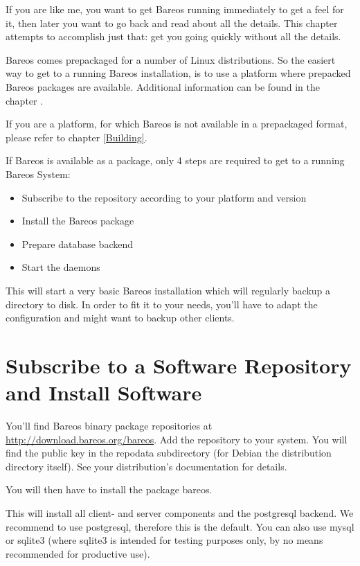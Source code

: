 If you are like me, you want to get Bareos running immediately to get a feel
for it, then later you want to go back and read about all the details. This
chapter attempts to accomplish just that: get you going quickly without all
the details.

Bareos comes prepackaged for a number of Linux distributions.
So the easiert way to get to a running Bareos installation, 
is to use a platform where prepacked Bareos packages are available.
Additional information can be found in the chapter .

If you are a platform, for which Bareos is not available in a prepackaged format,
please refer to chapter \vref{Building}.

If Bareos is available as a package, 
only 4 steps are required to get to a running Bareos System:
\begin{itemize}
    \item Subscribe to the repository according to your platform and version
    \item Install the Bareos package
    \item Prepare database backend
    \item Start the daemons
\end{itemize}

This will start a very basic Bareos installation which will regularly backup a directory to disk.
In order to fit it to your needs, you'll have to adapt the configuration and might want to backup other clients.

\section{Subscribe to a Software Repository and Install Software}

You'll find Bareos binary package repositories at \url{http://download.bareos.org/bareos}.
Add the repository to your system. 
You will find the public key in the repodata subdirectory 
(for Debian the distribution directory itself). 
See your distribution's documentation for details.
 
You will then have to install the package bareos. 

This will install all client- and server components and the postgresql backend. 
We recommend to use postgresql, therefore this is the default. 
You can also use mysql or sqlite3 
(where sqlite3 is intended for testing purposes only, by no means recommended for productive use).


